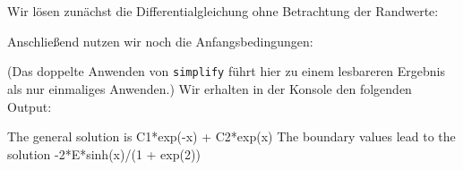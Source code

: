\section{}

Wir lösen zunächst die Differentialgleichung ohne Betrachtung der Randwerte:



Anschließend nutzen wir noch die Anfangsbedingungen:



(Das doppelte Anwenden von \texttt{simplify} führt hier zu einem lesbareren Ergebnis als nur einmaliges Anwenden.)
Wir erhalten in der Konsole den folgenden Output:

\begin{consoleoutput}
The general solution is C1*exp(-x) + C2*exp(x)
The boundary values lead to the solution -2*E*sinh(x)/(1 + exp(2))
\end{consoleoutput}
